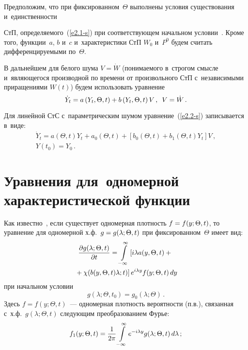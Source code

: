 \begin{multicols}{2}
Предположим, что при фиксированном~$\Theta$ выполнены условия существования 
и~единственности\linebreak\vspace*{-12pt}

\pagebreak

\noindent
 СтП, определяемого~(\ref{e2.1-s}) 
при соответствующем начальном условии~\cite{1-s, 5-s}. 
Кроме того, функции~$a$, $b$ и~$c$ и~характеристики СтП $W_0$ и~$P^0$ 
будем считать дифференцируемыми по~$\Theta$.

В дальнейшем для белого шума $V=\dot W$ (понимаемого в~строгом смысле и~являющегося производной по времени от произвольного СтП с~независимыми приращениями $W(t)$) будем использовать уравнение
\begin{equation}
\dot Y_t =a\left(Y_t, \Theta, t\right)+ b\left(Y_t, \Theta, t\right)V\,, 
\enskip V=\dot W\,.
    \label{e2.2-s}
    \end{equation}

Для линейной СтС с~параметрическим шумом уравнение~(\ref{e2.2-s}) 
записывается в~виде:
   \begin{multline}
    \dot Y_t = a(\Theta, t) Y_t + a_0 (\Theta, t) + \left[ b_0(\Theta, t) + 
    b_1(\Theta, t) Y_t\right] V\,,\\ Y(t_0) = Y_0\,.
    \label{e2.3-s}
    \end{multline}

\section{Уравнения для~одномерной характеристической функции}


Как известно~\cite{1-s}, если существует одномерная плотность $f\hm=f(y;\Theta,t)$, 
то уравнение для одномерной х.ф.\ $g\hm=g(\lambda;\Theta,t)$  
при фиксированном~$\Theta$ имеет вид:
\begin{multline}
\displaystyle\frac{\displaystyle \partial g (\lambda;\Theta,t)\mathstrut}{\displaystyle \partial t\mathstrut} = \int\limits_{-\infty}^\infty \left[ i\lambda a 
    (y,\Theta,t)+{}\right.\\
\left.    {}+ \chi( b( y,\Theta,t ) \lambda;t )\right] 
    e^{i\lambda y} f ( y; \Theta,t)\, dy
    \label{e3.1-s}
    \end{multline}
при начальном условии
\begin{equation}
g(\lambda; \Theta,t_0) = g_0 (\lambda;\Theta)\,.
    \label{e3.2-s}
    \end{equation}
Здесь $f=f(y;\Theta,t)$~--- одномерная плотность вероятности (п.в.), 
связанная с~х.ф.\ $g(\lambda;\Theta,t)$ следующим  преобразованием Фурье:
      \begin{equation}
      f_1( y;\Theta,t) = \displaystyle\frac{\displaystyle 1\mathstrut}{\displaystyle 2\pi\mathstrut} \int\limits_{-\infty}^\infty e^{-i\lambda y} 
    g (\lambda;\Theta,t)\, d\lambda\,;
    \label{e3.3-s}
    \end{equation}
    

\end{multicols}
